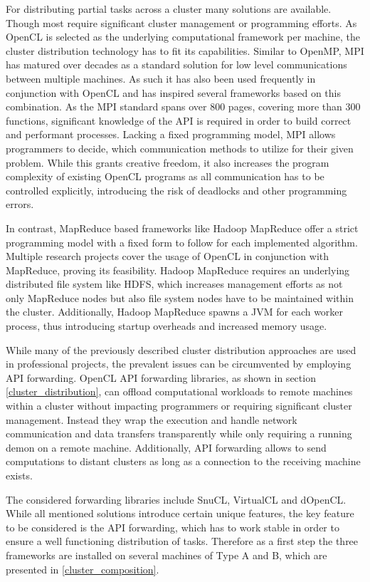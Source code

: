 For distributing partial tasks across a cluster many solutions are available. Though most require significant cluster management or programming efforts. As OpenCL is selected as the underlying computational framework per machine, the cluster distribution technology has to fit its capabilities.
Similar to OpenMP, MPI has matured over decades as a standard solution for low level communications between multiple machines. As such it has also been used frequently in conjunction with OpenCL and has inspired several frameworks based on this combination\cite{mpi-acc}\cite{starpu}. As the MPI standard spans over 800 pages, covering more than 300 functions\cite{mpi_spec}, significant knowledge of the API is required in order to build correct and performant processes. Lacking a fixed programming model, MPI allows programmers to decide, which communication methods to utilize for their given problem. While this grants creative freedom, it also increases the program complexity of existing OpenCL programs as all communication has to be controlled explicitly, introducing the risk of deadlocks and other programming errors.

In contrast, MapReduce based frameworks like Hadoop MapReduce offer a strict programming model with a fixed form to follow for each implemented algorithm. Multiple research projects cover the usage of OpenCL in conjunction with MapReduce, proving its feasibility\cite{hadoopcl}\cite{hadoop+}. Hadoop MapReduce requires an underlying distributed file system like HDFS, which increases management efforts as not only MapReduce nodes but also file system nodes have to be maintained within the cluster. Additionally, Hadoop MapReduce spawns a JVM for each worker process, thus introducing startup overheads and increased memory usage.

While many of the previously described cluster distribution approaches are used in professional projects, the prevalent issues can be circumvented by employing API forwarding. OpenCL API forwarding libraries, as shown in section \ref{cluster_distribution}, can offload computational workloads to remote machines within a cluster without impacting programmers or requiring significant cluster management. Instead they wrap the execution and handle network communication and data transfers transparently while only requiring a running demon on a remote machine. Additionally, API forwarding allows to send computations to distant clusters as long as a connection to the receiving machine exists.

The considered forwarding libraries include SnuCL, VirtualCL and dOpenCL. While all mentioned solutions introduce certain unique features, the key feature to be considered is the API forwarding, which has to work stable in order to ensure a well functioning distribution of tasks. Therefore as a first step the three frameworks are installed on several machines of Type A and B, which are presented in \ref{cluster_composition}.

